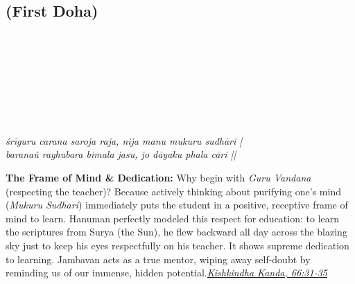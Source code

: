 \subsection*{ (First Doha)}

\begin{minipage}[t]{0.55\textwidth}
\vspace{0pt}

{\large \linespread{1.5}\selectfont
{}\\
\\
\\
\par}

\vspace{0.5em}

{ \linespread{1.5}\selectfont
{}\\
\\
\\
\par}

\vspace{0.5em}

{ \linespread{1.3}\selectfont
\textit{śrīguru carana saroja raja, nija manu mukuru sudhāri |}\\
\textit{baranaũ raghubara bimala jasu, jo dāyaku phala cāri ||}
\par}
\end{minipage}%
\hfill
\begin{minipage}[t]{0.42\textwidth}
\vspace{0pt}
\begin{tcolorbox}[anchorbox]
\textbf{The Frame of Mind & Dedication:} Why begin with \textit{Guru Vandana} (respecting the teacher)? Because actively thinking about purifying one's mind (\textit{Mukuru Sudhari}) immediately puts the student in a positive, receptive frame of mind to learn. Hanuman perfectly modeled this respect for education: to learn the scriptures from Surya (the Sun), he flew backward all day across the blazing sky just to keep his eyes respectfully on his teacher. It shows supreme dedication to learning.
\vspace{0.5em}\newline Jambavan acts as a true mentor, wiping away self-doubt by reminding us of our immense, hidden potential.\newline\null\hfill\href{https://www.valmiki.iitk.ac.in/sloka?field_kanda_tid=4&language=dv&field_sarga_value=66}{\textit{Kishkindha Kanda, 66:31-35}}
\end{tcolorbox}
\end{minipage}

